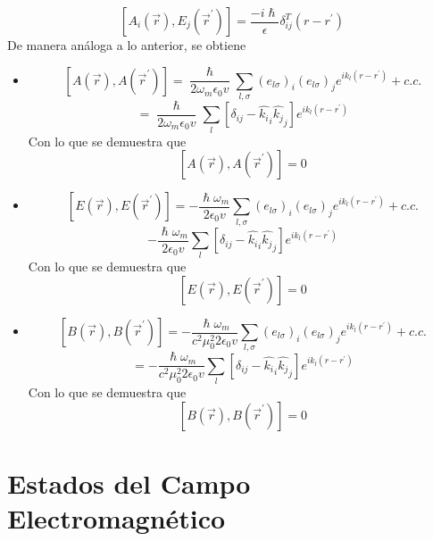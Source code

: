 \documentclass{book}
\begin{document}
    \begin{equation}{  [A_i(\vec{r}),E_j(\vec{r}^\prime)]=\frac{-i\hslash}{\epsilon}\delta_{ij}^T({r}-{r}^\prime)} \end{equation}
    De manera análoga a lo anterior, se obtiene
    \begin{itemize}
        \item \begin{equation}{ [A(\vec{r}),A(\vec{r}^\prime)]=\frac{\hslash}{2\omega_m\epsilon_0 v}\sum_{l,\sigma}({e}_{l\sigma})_i({e}_{l\sigma})_j e^{i{k}_l({r}-{r}^\prime)}+c.c.} \end{equation} \begin{equation}{=\frac{\hslash}{2\omega_m\epsilon_0 v}\sum_{l}[\delta_{ij}-\hat{{k}_{i}}_i\hat{{k}_{j}}_j]e^{i{k}_l({r}-{r}^\prime)}} \end{equation} Con lo que se demuestra que\begin{equation}{ [A(\vec{r}),A(\vec{r}^\prime)]=0} \end{equation}
        \item \begin{equation}{ [E(\vec{r}),E(\vec{r}^\prime)]=-\frac{\hslash\omega_m}{2\epsilon_0 v}\sum_{l,\sigma}({e}_{l\sigma})_i({e}_{l\sigma})_j e^{i{k}_l({r}-{r}^\prime)}+c.c.} \end{equation} \begin{equation} {-\frac{\hslash\omega_m}{2\epsilon_0 v}\sum_{l}[\delta_{ij}-\hat{{k}_{i}}_i\hat{{k}_{j}}_j] e^{i{k}_l({r}-{r}^\prime)}} \end{equation}Con lo que se demuestra que \begin{equation}{ [E(\vec{r}),E(\vec{r}^\prime)]=0} \end{equation}
        \item  \begin{equation}{ [B(\vec{r}),B(\vec{r}^\prime)]=-\frac{\hslash\omega_m}{c^2\mu_0^2 2\epsilon_0v}\sum_{l,\sigma}({e}_{l\sigma})_i({e}_{l\sigma})_j e^{i{k}_l({r}-{r}^\prime)}+c.c.} \end{equation} \begin{equation}{=-\frac{\hslash\omega_m}{c^2\mu_0^2 2\epsilon_0v}\sum_{l}[\delta_{ij}-\hat{{k}_{i}}_i\hat{{k}_{j}}_j] e^{i{k}_l({r}-{r}^\prime)}} \end{equation}Con lo que se demuestra que \begin{equation}{ [B(\vec{r}),B(\vec{r}^\prime)]=0} \end{equation}
    \end{itemize}
\section{Estados del Campo Electromagnético}
\end{document}
